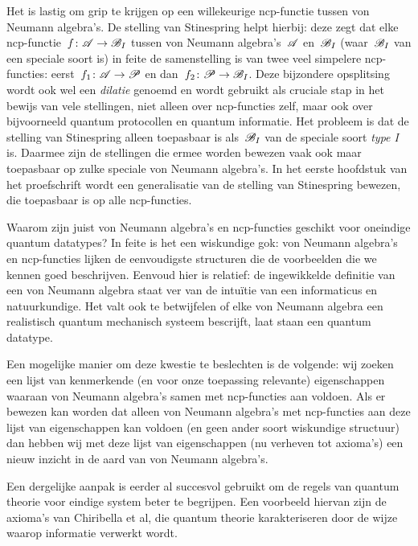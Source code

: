 Het is lastig om grip te krijgen
    op een willekeurige ncp-functie
    tussen von Neumann algebra's.
De stelling van Stinespring helpt hierbij:
    deze zegt dat elke ncp-functie~$f\colon \mathscr{A} \to \mathscr{B}_I$
    tussen von Neumann algebra's~$\mathscr{A}$ en~$\mathscr{B}_I$
        (waar~$\mathscr{B}_I$ van een speciale soort is)
        in feite de samenstelling is
        van twee veel simpelere ncp-functies:
        eerst~$f_1\colon \mathscr{A} \to \mathscr{P}$
            en dan~$f_2\colon \mathscr{P} \to \mathscr{B}_I$.
    Deze bijzondere opsplitsing wordt
        ook wel een \emph{dilatie} genoemd
            en wordt gebruikt als cruciale stap in het
    bewijs van vele stellingen, niet alleen over ncp-functies zelf,
    maar ook over bijvoorneeld quantum protocollen en quantum informatie.
Het probleem is dat de stelling van Stinespring alleen toepasbaar
    is als~$\mathscr{B}_I$ van de speciale soort \emph{type I} is.
Daarmee zijn de stellingen die ermee worden bewezen vaak ook maar toepasbaar
    op zulke speciale von Neumann algebra's.
In het eerste hoofdstuk van het proefschrift
    wordt een generalisatie van de stelling van Stinespring
    bewezen, die toepasbaar is op alle ncp-functies.

Waarom zijn juist von Neumann algebra's en ncp-functies
    geschikt voor oneindige quantum datatypes?
In feite is het een wiskundige gok:
    von Neumann algebra's en ncp-functies
    lijken de eenvoudigste structuren die
    de voorbeelden die we kennen goed beschrijven.
Eenvoud hier is relatief: de ingewikkelde definitie
    van een von Neumann algebra
    staat ver van de intu\"itie van een
    informaticus en natuurkundige.
Het valt ook te betwijfelen of elke von Neumann
    algebra een realistisch quantum mechanisch systeem bescrijft,
    laat staan een quantum datatype.

Een mogelijke manier om deze kwestie te beslechten is de volgende:
    wij zoeken een lijst van kenmerkende
    (en voor onze toepassing relevante) eigenschappen waaraan
        von Neumann algebra's samen met ncp-functies aan voldoen.
Als er bewezen kan worden dat alleen von Neumann algebra's
    met ncp-functies aan deze lijst van eigenschappen kan voldoen
    (en geen ander soort wiskundige structuur)
    dan hebben wij met deze lijst van eigenschappen
        (nu verheven tot axioma's)
    een nieuw inzicht in de aard van von Neumann algebra's.

Een dergelijke aanpak is eerder al succesvol gebruikt
    om de regels van quantum theorie voor eindige system beter te begrijpen.
Een voorbeeld hiervan zijn de axioma's van Chiribella et al,
    die quantum theorie karakteriseren door
    de wijze waarop informatie verwerkt wordt.

